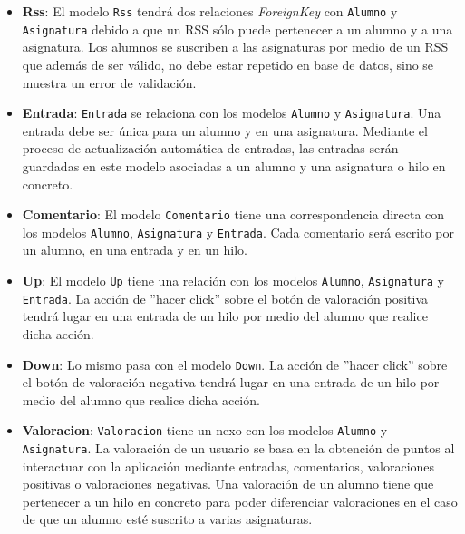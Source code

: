 \documentclass[a4paper, 12pt]{book}
\begin{document}
\begin{itemize}
  Para realizar la relaci\'on \texttt{Asignatura} - \texttt{Alumno} se ha utilizado un modelo intermedio \texttt{Rss} a trav\'es del argumento 
  \textit{Through}. Con este argumento, a la relaci\'on \textit{ManyToMany} se le est\'a se\~nalando que va a actuar un modelo intermediario. El modelo 
  intermediario se utilizar\'a para regular esta relaci\'on por lo que se pueden colocar campos adicionales en \texttt{Rss} para que \texttt{Asignatura}
  pueda acceder a m\'as datos relevantes de \texttt{Alumno}.
  \item {\bfseries Rss}: El modelo \texttt{Rss} tendr\'a dos relaciones \textit{ForeignKey} con \texttt{Alumno} y \texttt{Asignatura} debido
  a que un RSS s\'olo puede pertenecer a un alumno y a una asignatura. Los alumnos se suscriben a las asignaturas por medio de un RSS que adem\'as de 
  ser v\'alido, no debe estar repetido en base de datos, sino se muestra un error de validaci\'on.
  \item {\bfseries Entrada}: \texttt{Entrada} se relaciona con los modelos \texttt{Alumno} y \texttt{Asignatura}. Una entrada debe ser \'unica para un 
  alumno y en una asignatura. Mediante el proceso de actualizaci\'on autom\'atica de entradas, las entradas ser\'an guardadas en este modelo asociadas
  a un alumno y una asignatura o hilo en concreto.
  \item {\bfseries Comentario}: El modelo \texttt{Comentario} tiene una correspondencia directa con los modelos \texttt{Alumno}, \texttt{Asignatura} y 
  \texttt{Entrada}. Cada comentario ser\'a escrito por un alumno, en una entrada y en un hilo.
  \item {\bfseries Up}: El modelo \texttt{Up} tiene una relaci\'on con los modelos \texttt{Alumno}, \texttt{Asignatura} y \texttt{Entrada}. La acci\'on de 
  ''hacer click'' sobre el bot\'on de valoraci\'on positiva tendr\'a lugar en una entrada de un hilo por medio del alumno que realice dicha acci\'on.
  \item {\bfseries Down}: Lo mismo pasa con el modelo \texttt{Down}. La acci\'on de ''hacer click'' sobre el bot\'on de valoraci\'on negativa tendr\'a 
  lugar en una entrada de un hilo por medio del alumno que realice dicha acci\'on.
  \item {\bfseries Valoracion}: \texttt{Valoracion} tiene un nexo con los modelos \texttt{Alumno} y \texttt{Asignatura}. La valoraci\'on de un usuario se 
  basa en la obtenci\'on de puntos al interactuar con la aplicaci\'on mediante entradas, comentarios, valoraciones positivas o valoraciones negativas.
  Una valoraci\'on de un alumno tiene que pertenecer a un hilo en concreto para poder diferenciar valoraciones en el caso de que un alumno est\'e suscrito
  a varias asignaturas.
\end{itemize}
\end{document}
